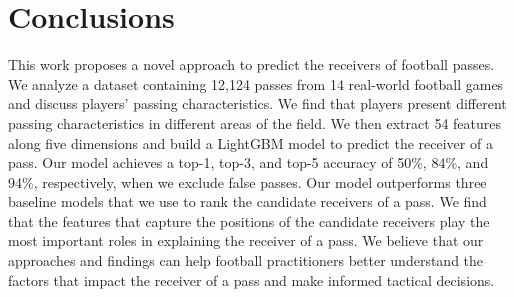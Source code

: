 \section{Conclusions} \label{conclusions}

This work proposes a novel approach to predict the receivers of football passes.
We analyze a dataset containing 12,124 passes from 14 real-world football games and discuss players' passing characteristics. We find that players present different passing characteristics in different areas of the field.
We then extract 54 features along five dimensions and build a LightGBM model to predict the receiver of a pass. 
Our model achieves a top-1, top-3, and top-5 accuracy of 50\%, 84\%, and 94\%, respectively, when we exclude false passes.
Our model outperforms three baseline models that we use to rank the candidate receivers of a pass.
We find that the features that capture the positions of the candidate receivers play the most important roles in explaining the receiver of a pass.
We believe that our approaches and findings can help football practitioners better understand the factors that impact the receiver of a pass and make informed tactical decisions.